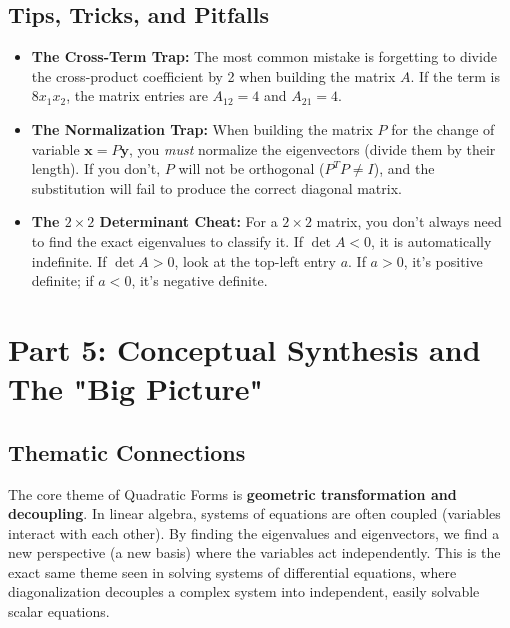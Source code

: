 \documentclass[11pt, letterpaper]{article}
\theoremstyle{definition}
\theoremstyle{remark}
\newcommand{\x}{\mathbf{x}}
\newcommand{\y}{\mathbf{y}}
\begin{document}
\subsection{Tips, Tricks, and Pitfalls}
\begin{itemize}
    \item \textbf{The Cross-Term Trap:} The most common mistake is forgetting to divide the cross-product coefficient by 2 when building the matrix $A$. If the term is $8x_1 x_2$, the matrix entries are $A_{12} = 4$ and $A_{21} = 4$.
    \item \textbf{The Normalization Trap:} When building the matrix $P$ for the change of variable $\x = P\y$, you \textit{must} normalize the eigenvectors (divide them by their length). If you don't, $P$ will not be orthogonal ($P^T P \neq I$), and the substitution will fail to produce the correct diagonal matrix.
    \item \textbf{The $2 \times 2$ Determinant Cheat:} For a $2 \times 2$ matrix, you don't always need to find the exact eigenvalues to classify it. If $\det A < 0$, it is automatically indefinite. If $\det A > 0$, look at the top-left entry $a$. If $a > 0$, it's positive definite; if $a < 0$, it's negative definite.
\end{itemize}

\newpage

\section{Part 5: Conceptual Synthesis and The "Big Picture"}

\subsection{Thematic Connections}
The core theme of Quadratic Forms is \textbf{geometric transformation and decoupling}. In linear algebra, systems of equations are often coupled (variables interact with each other). By finding the eigenvalues and eigenvectors, we find a new perspective (a new basis) where the variables act independently. This is the exact same theme seen in solving systems of differential equations, where diagonalization decouples a complex system into independent, easily solvable scalar equations.
\end{document}
